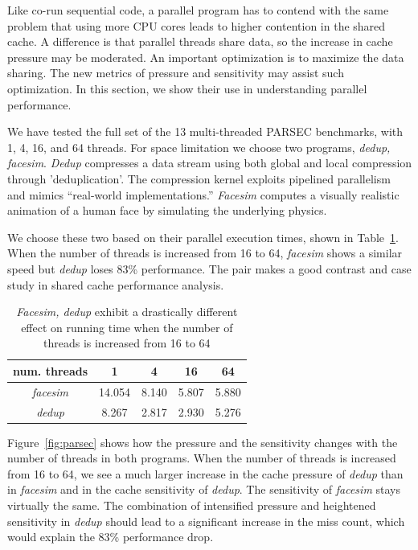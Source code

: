 Like co-run sequential code, a parallel program has to contend with
the same problem that using more CPU cores leads to higher contention
in the shared cache.  A difference is that parallel threads share
data, so the increase in cache pressure may be moderated.  An
important optimization is to maximize the data sharing.  The new
metrics of pressure and sensitivity may assist such optimization.  In
this section, we show their use in understanding parallel performance.

We have tested the full set of the 13 multi-threaded PARSEC
benchmarks, with 1, 4, 16, and 64 threads.  For space limitation we
choose two programs, {\em dedup, facesim}.  {\em Dedup} compresses a
data stream using both global and local compression through
'deduplication'. The compression kernel exploits pipelined parallelism
and mimics ``real-world implementations.'' {\em Facesim} computes a
visually realistic animation of a human face by simulating the
underlying physics.

We choose these two based on their parallel execution times, shown in
Table~\ref{tbl:parsec_runtime}.  When the number of threads is increased
from 16 to 64, {\em facesim} shows a similar speed but {\em dedup}
loses 83\% performance.  The pair makes a good contrast and case study
in shared cache performance analysis.

\begin{table}[h!]
\centering
\begin{tabular}{|c|c|c|c|c|}
\hline
num. threads & 1 & 4 & 16 & 64 \\ \hline \hline
{\em facesim} & 14.054 & 8.140 & 5.807 & 5.880 \\ \hline
{\em dedup} & 8.267 & 2.817 & 2.930 & 5.276 \\ \hline
\end{tabular}
\caption{{\em Facesim, dedup} exhibit a drastically different effect on
  running time when the number of threads is increased from 16 to 64}
\label{tbl:parsec_runtime}
\end{table}

Figure~\ref{fig:parsec} shows how the pressure and the sensitivity
changes with the number of threads in both programs.  When the number
of threads is increased from 16 to 64, we see a much larger increase
in the cache pressure of {\em dedup} than in {\em facesim} and in the
cache sensitivity of {\em dedup}.  The sensitivity of {\em facesim}
stays virtually the same.  The combination of intensified pressure and 
heightened sensitivity in {\em dedup} should lead to a significant
increase in the miss count, which would explain the 83\% performance
drop.

